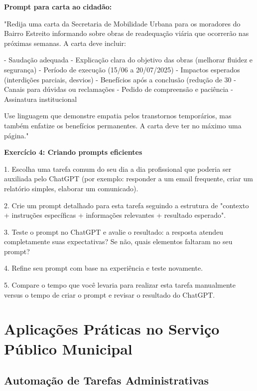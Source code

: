\documentclass[12pt,a4paper]{book}
\begin{document}
\begin{tcolorbox}[exemplo]
\textbf{Prompt para carta ao cidadão:}

"Redija uma carta da Secretaria de Mobilidade Urbana para os moradores do Bairro Estreito informando sobre obras de readequação viária que ocorrerão nas próximas semanas. A carta deve incluir:

- Saudação adequada
- Explicação clara do objetivo das obras (melhorar fluidez e segurança)
- Período de execução (15/06 a 20/07/2025)
- Impactos esperados (interdições parciais, desvios)
- Benefícios após a conclusão (redução de 30%
- Canais para dúvidas ou reclamações
- Pedido de compreensão e paciência
- Assinatura institucional

Use linguagem que demonstre empatia pelos transtornos temporários, mas também enfatize os benefícios permanentes. A carta deve ter no máximo uma página."
\end{tcolorbox}

\begin{tcolorbox}[pratica]
\textbf{Exercício 4: Criando prompts eficientes}

1. Escolha uma tarefa comum do seu dia a dia profissional que poderia ser auxiliada pelo ChatGPT (por exemplo: responder a um email frequente, criar um relatório simples, elaborar um comunicado).

2. Crie um prompt detalhado para esta tarefa seguindo a estrutura de "contexto + instruções específicas + informações relevantes + resultado esperado".

3. Teste o prompt no ChatGPT e avalie o resultado: a resposta atendeu completamente suas expectativas? Se não, quais elementos faltaram no seu prompt?

4. Refine seu prompt com base na experiência e teste novamente.

5. Compare o tempo que você levaria para realizar esta tarefa manualmente versus o tempo de criar o prompt e revisar o resultado do ChatGPT.
\end{tcolorbox}

\chapter{Aplicações Práticas no Serviço Público Municipal}

\section{Automação de Tarefas Administrativas}
\end{document}
